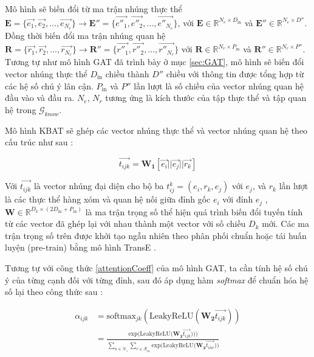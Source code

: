 Mô hình sẽ biến đổi từ ma trận nhúng thực thể 
$\mathbf{E} = \Big\{\overrightarrow{e_1}, \overrightarrow{e_2}, ...,  \overrightarrow{e_{N_e}}\Big\} \xrightarrow{} \mathbf{E''} = \Big\{\overrightarrow{e''_1}, \overrightarrow{e''_2}, ...,  \overrightarrow{e''_{N_e}}\Big\}$, với $\mathbf{E} \in \mathbb{R}^{N_e \times D_{\text{in}}}$ và $\mathbf{E''} \in \mathbb{R}^{N_e \times D''}$.
Đồng thời biến đổi ma trận nhúng quan hệ 
$\mathbf{R} = \Big\{\overrightarrow{r_1}, \overrightarrow{r_2}, ...,  \overrightarrow{r_{N_r}}\Big\} \xrightarrow{} \mathbf{R''} = \Big\{\overrightarrow{r''_1}, \overrightarrow{r''_2}, ...,  \overrightarrow{r''_{N_r}}\Big\}$ với $\mathbf{R} \in \mathbb{R}^{N_r \times P_{\text{in}}}$ và $\mathbf{R''} \in \mathbb{R}^{N_r \times P''}$. Tương tự như mô hình GAT đã trình bày ở mục \ref{sec:GAT}, mô hình sẽ biến đổi vector nhúng thực thể $D_{\text{in}}$ chiều thành $D''$ chiều với thông tin được tổng hợp từ các hệ số chú ý lân cận. $P_{\text{in}}$ và $P''$ lần lượt là số chiều của vector nhúng quan hệ đầu vào và đầu ra. $N_e$, $N_r$ tương ứng là kích thước của tập thực thể và tập quan hệ trong $\mathcal{G}_{know}$.

Mô hình KBAT sẽ ghép các vector nhúng thực thể và vector nhúng quan hệ theo cấu trúc như sau :

\begin{equation}
\label{attentionWithRelation}
\overrightarrow{t_{ijk}} = \mathbf{W_1} [\overrightarrow{e_i} || \overrightarrow{e_j} || \overrightarrow{r_k}]
\end{equation}

Với $\overrightarrow{t_{ijk}}$ là vector nhúng đại diện cho bộ ba  $t_{ij}^k = (e_i, r_k, e_j)$ với $e_j$, và $r_k$ lần lượt là các thực thể hàng xóm và quan hệ nối giữa đỉnh gốc $e_i$ với đỉnh $e_j$ , $\mathbf{W} \in \mathbb{R}^{D_k \times (2 D_{\text{in}} + P_{\text{in}})}$ là ma trận trọng số thể hiện quá trình biến đổi tuyến tính từ các vector đã ghép lại với nhau thành một vector với số chiều $D_k$ mới. Các ma trận trọng số trên được khởi tạo ngẫu nhiên theo phân phối chuẩn hoặc tái huấn luyện (pre-train) bằng mô hình TransE \cite{bordes2013translating}.

Tương tự với công thức \ref{attentionCoeff} của mô hình GAT, ta cần tính hệ số chú ý của từng cạnh đối với từng đỉnh, sau đó áp dụng hàm \textit{softmax} để chuẩn hóa hệ số lại theo công thức sau :

\begin{equation}
\label{attentionRelationCoeff}
\begin{split}
\alpha_{ijk}& = \text{softmax}_{jk}(\text{LeakyReLU}(\mathbf{W_2} \overrightarrow{t_{ijk}}))\\
&= \frac{
	\text{exp} \Big( \text{LeakyReLU} \Big( \mathbf{W_2} \overrightarrow{t_{ijk}}\Big) \Big))
}
{
	\sum_{n\in \mathcal{N}_i} \sum_{r\in \mathcal{R}_{in}}
	\text{exp} \Big( \text{LeakyReLU} \Big( \mathbf{W_2} \overrightarrow{t_{inr}} \Big) \Big)
}
\end{split}
\end{equation}

